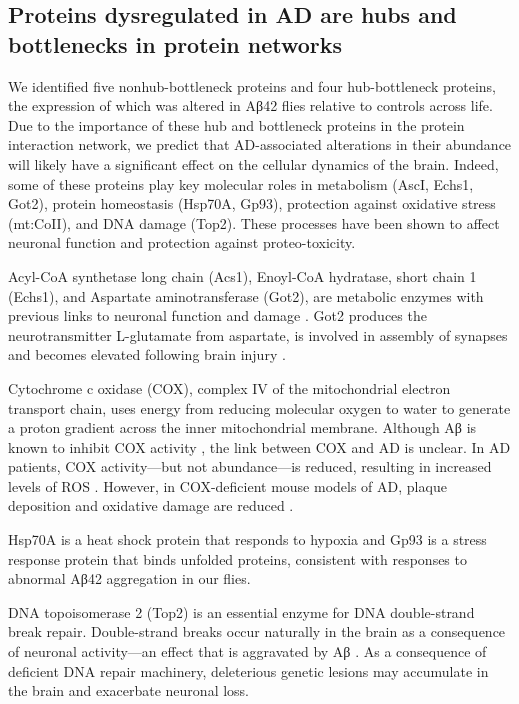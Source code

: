 \subsection{Proteins dysregulated in AD are hubs and bottlenecks in protein networks}

We identified five nonhub-bottleneck proteins and four hub-bottleneck proteins,
the expression of which was altered in Aβ42 flies relative to controls across life.
Due to the importance of these hub and bottleneck proteins in the protein interaction network,
we predict that AD-associated alterations in their abundance will likely have a
significant effect on the cellular dynamics of the brain.
Indeed, some of these proteins play key molecular roles in metabolism (AscI, Echs1, Got2),
protein homeostasis (Hsp70A, Gp93), protection against oxidative stress (mt:CoII),
and DNA damage (Top2).
These processes have been shown to affect neuronal function and protection
against proteo-toxicity.

Acyl-CoA synthetase long chain (Acs1), Enoyl-CoA hydratase, short chain 1 (Echs1),
and Aspartate aminotransferase (Got2), are metabolic enzymes with previous links to
neuronal function and damage \cite{Cai2011,Szutowicz2013}.
Got2 produces the neurotransmitter L-glutamate from aspartate,
is involved in assembly of synapses and becomes elevated following brain injury \cite{Maas1977}.

Cytochrome c oxidase (COX), complex IV of the mitochondrial electron transport chain,
uses energy from reducing molecular oxygen to water to generate a proton gradient across
the inner mitochondrial membrane.
Although Aβ is known to inhibit COX activity \cite{Casley2002},
the link between COX and AD is unclear.
In AD patients, COX activity---but not abundance---is reduced,
resulting in increased levels of ROS \cite{Cardoso2004}.
However, in COX-deficient mouse models of AD,
plaque deposition and oxidative damage are reduced \cite{Fukui2007}.

Hsp70A is a heat shock protein that responds to hypoxia and Gp93 is a stress response
protein that binds unfolded proteins,
consistent with responses to abnormal Aβ42 aggregation in our flies.

DNA topoisomerase 2 (Top2) is an essential enzyme for DNA double-strand break repair.
Double-strand breaks occur naturally in the brain as a consequence of neuronal activity---an
effect that is aggravated by Aβ \cite{Suberbielle2013}.
As a consequence of deficient DNA repair machinery,
deleterious genetic lesions may accumulate in the brain and exacerbate neuronal loss.

